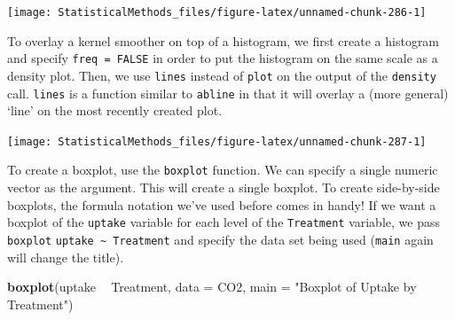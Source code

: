 \documentclass[
]{book}
\newenvironment{Shaded}{\begin{snugshade}}{\end{snugshade}}
\newcommand{\DataTypeTok}[1]{\textcolor[rgb]{0.13,0.29,0.53}{#1}}
\newcommand{\DecValTok}[1]{\textcolor[rgb]{0.00,0.00,0.81}{#1}}
\newcommand{\KeywordTok}[1]{\textcolor[rgb]{0.13,0.29,0.53}{\textbf{#1}}}
\newcommand{\NormalTok}[1]{#1}
\newcommand{\OperatorTok}[1]{\textcolor[rgb]{0.81,0.36,0.00}{\textbf{#1}}}
\newcommand{\OtherTok}[1]{\textcolor[rgb]{0.56,0.35,0.01}{#1}}
\newcommand{\StringTok}[1]{\textcolor[rgb]{0.31,0.60,0.02}{#1}}
\theoremstyle{definition}
\theoremstyle{definition}
\theoremstyle{definition}
\theoremstyle{remark}
\begin{document}
\begin{center}\texttt{[image: StatisticalMethods\_files/figure-latex/unnamed-chunk-286-1]} \end{center}

To overlay a kernel smoother on top of a histogram, we first create a histogram and specify \texttt{freq\ =\ FALSE} in order to put the histogram on the same scale as a density plot. Then, we use \texttt{lines} instead of \texttt{plot} on the output of the \texttt{density} call. \texttt{lines} is a function similar to \texttt{abline} in that it will overlay a (more general) `line' on the most recently created plot.

\begin{Shaded}
\end{Shaded}

\begin{center}\texttt{[image: StatisticalMethods\_files/figure-latex/unnamed-chunk-287-1]} \end{center}

To create a boxplot, use the \texttt{boxplot} function. We can specify a single numeric vector as the argument. This will create a single boxplot. To create side-by-side boxplots, the formula notation we've used before comes in handy! If we want a boxplot of the \texttt{uptake} variable for each level of the \texttt{Treatment} variable, we pass \texttt{boxplot} \texttt{uptake\ \textasciitilde{}\ Treatment} and specify the data set being used (\texttt{main} again will change the title).

\begin{Shaded}
\begin{Highlighting}[]
\KeywordTok{boxplot}\NormalTok{(uptake }\OperatorTok{~}\StringTok{ }\NormalTok{Treatment, }\DataTypeTok{data =}\NormalTok{ CO2, }\DataTypeTok{main =} \StringTok{"Boxplot of Uptake by Treatment"}\NormalTok{)}
\end{Highlighting}
\end{Shaded}
\end{document}
